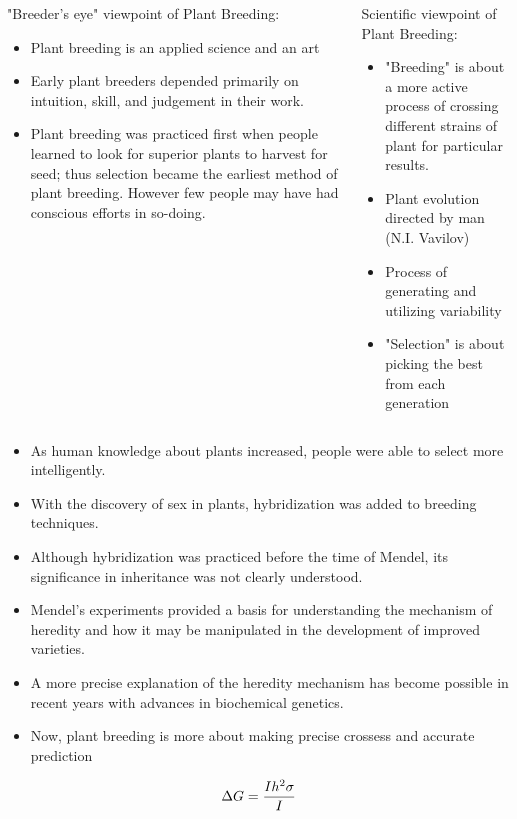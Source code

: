 \documentclass[11pt,ignorenonframetext,aspectratio=169]{beamer}
\begin{document}
\begin{frame}{}
\protect\hypertarget{section-4}{}
\begin{columns}
\begin{column}{0.5\textwidth}
"Breeder's eye" viewpoint of Plant Breeding: 
\begin{itemize}
\item Plant breeding is an applied science and an art 
\item Early plant breeders depended primarily on intuition, skill, and judgement in their work.
\item Plant breeding was practiced first when people learned to look for superior plants to harvest for seed; thus selection became the earliest method of plant breeding. However few people may have had conscious efforts in so-doing.
\end{itemize}
\end{column}
\begin{column}{0.5\textwidth}  %
Scientific viewpoint of Plant Breeding: 
\begin{itemize}
\item "Breeding" is about a more active process of crossing different strains of plant for particular results.
\item Plant evolution directed by man (N.I. Vavilov)
\item Process of generating and utilizing variability
\item "Selection" is about picking the best from each generation
\end{itemize}
\end{column}
\end{columns}
\end{frame}

\begin{frame}{}
\protect\hypertarget{section-5}{}
\begin{itemize}
\item
  As human knowledge about plants increased, people were able to select
  more intelligently.
\item
  With the discovery of sex in plants, hybridization was added to
  breeding techniques.
\item
  Although hybridization was practiced before the time of Mendel, its
  significance in inheritance was not clearly understood.
\item
  Mendel's experiments provided a basis for understanding the mechanism
  of heredity and how it may be manipulated in the development of
  improved varieties.
\item
  A more precise explanation of the heredity mechanism has become
  possible in recent years with advances in biochemical genetics.
\item
  Now, plant breeding is more about making precise crossess and accurate
  prediction
\end{itemize}

\[\Large \Delta{G}=\frac{Ih^2 \sigma}{I}\]
\end{frame}
\end{document}
